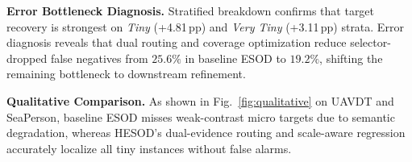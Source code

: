 \textbf{Error Bottleneck Diagnosis.} Stratified breakdown confirms that target recovery is strongest on \emph{Tiny} (+4.81\,pp) and \emph{Very Tiny} (+3.11\,pp) strata. Error diagnosis reveals that dual routing and coverage optimization reduce selector-dropped false negatives from $25.6\%$ in baseline ESOD to \textbf{$19.2\%$}, shifting the remaining bottleneck to downstream refinement.

\textbf{Qualitative Comparison.} As shown in Fig.~\ref{fig:qualitative} on UAVDT and SeaPerson, baseline ESOD misses weak-contrast micro targets due to semantic degradation, whereas HESOD's dual-evidence routing and scale-aware regression accurately localize all tiny instances without false alarms.
